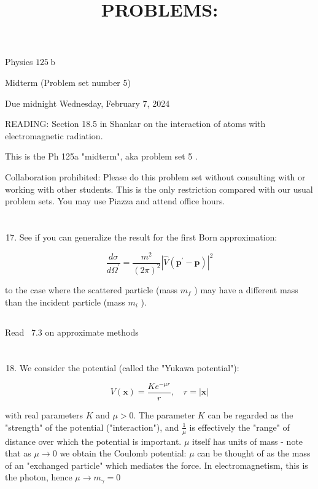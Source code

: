 \documentclass[12pt]{article}
\title{PROBLEMS: }
\author{}
\date{}
\begin{document}
\maketitle
Physics $125 \mathrm{~b}$

Midterm (Problem set number 5)

Due midnight Wednesday, February 7, 2024

READING: Section 18.5 in Shankar on the interaction of atoms with electromagnetic radiation.

This is the Ph 125a "midterm", aka problem set 5 .

Collaboration prohibited: Please do this problem set without consulting with or working with other students. This is the only restriction compared with our usual problem sets. You may use Piazza and attend office hours.
\section{}
\begin{enumerate}
  \setcounter{enumi}{16}
  \item See if you can generalize the result for the first Born approximation:
\end{enumerate}

$$
\frac{d \sigma}{d \Omega^{\prime}}=\frac{m^{2}}{(2 \pi)^{2}}\left|\hat{V}\left(\mathbf{p}^{\prime}-\mathbf{p}\right)\right|^{2}
$$

to the case where the scattered particle (mass $m_{f}$ ) may have a different mass than the incident particle (mass $m_{i}$ ).
\subsection{}
Read ~7.3 on approximate methods
\section{}
\begin{enumerate}
  \setcounter{enumi}{17}
  \item We consider the potential (called the "Yukawa potential"):
\end{enumerate}

$$
V(\mathbf{x})=\frac{K e^{-\mu r}}{r}, \quad r=|\mathbf{x}|
$$

with real parameters $K$ and $\mu>0$. The parameter $K$ can be regarded as the "strength" of the potential ("interaction"), and $\frac{1}{\mu}$ is effectively the "range" of distance over which the potential is important. $\mu$ itself has units of mass - note that as $\mu \rightarrow 0$ we obtain the Coulomb potential: $\mu$ can be thought of as the mass of an "exchanged particle" which mediates the force. In electromagnetism, this is the photon, hence $\mu \rightarrow m_{\gamma}=0$
\end{document}
